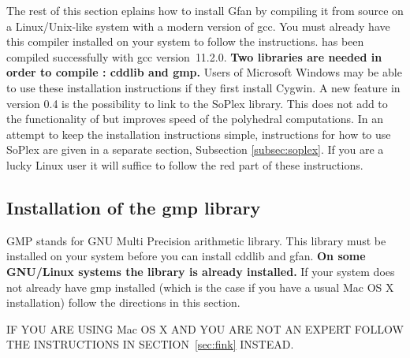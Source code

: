 


The rest of this section eplains how to install Gfan by compiling it from source on a Linux/Unix-like
system with a modern version of gcc. You must already have this compiler installed on your system to follow the instructions. \name has been compiled
successfully with gcc version~11.2.0. {\bf Two libraries are needed in order
to compile \name: {cddlib} and { gmp}.} Users of Microsoft
Windows may be able to use these installation instructions if they
first install Cygwin. A new feature in \name version 0.4 is the
possibility to link to the SoPlex \cite{wunderling} library. This does
not add to the functionality of \name but improves speed of the
polyhedral computations. In an attempt to keep the installation instructions simple, instructions for how to use SoPlex are given in a separate section, Subsection \ref{subsec:soplex}. {\color{red} If you are a lucky Linux user it will suffice to follow the red part of these instructions.}

\subsection{Installation of the gmp library}
GMP stands for GNU Multi Precision arithmetic library. This library
must be installed on your system before you can install cddlib and
gfan.
{\color{red}
{\bf On some GNU/Linux systems the library is already installed.}}
If your system does not already
have gmp installed (which is the case if you have a usual Mac OS X
installation) follow the directions in this section.

\vspace{0.3cm}
IF YOU ARE USING Mac OS X AND YOU ARE NOT AN EXPERT FOLLOW THE INSTRUCTIONS IN SECTION~\ref{sec:fink} INSTEAD.

